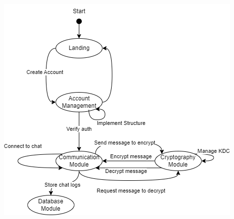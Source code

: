 \documentclass[]{article}
\begin{document}
\begin{center}
	\includegraphics[scale = 0.8]{3A04_D1.png}
\end{center}
\end{document}

